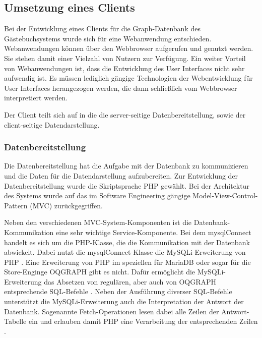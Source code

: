 \subsection{Umsetzung eines Clients}
Bei der Entwicklung eines Clients für die Graph-Datenbank des Gästebuchsystems wurde sich für eine Webanwendung entschieden. Webanwendungen können über den Webbrowser aufgerufen und genutzt werden. Sie stehen damit einer Vielzahl von Nutzern zur Verfügung. Ein weiter Vorteil von Webanwendungen ist, dass die Entwicklung des User Interfaces nicht sehr aufwendig ist. Es müssen lediglich gängige Technologien der Webentwicklung für User Interfaces herangezogen werden, die dann schließlich vom Webbrowser interpretiert werden.

Der Client teilt sich auf in die die server-seitige Datenbereitstellung, sowie der client-seitige Datendarstellung.

\subsubsection{Datenbereitstellung}
Die Datenbereitstellung hat die Aufgabe mit der Datenbank zu kommunizieren und die Daten für die Datendarstellung aufzubereiten. Zur Entwicklung der Datenbereitstellung wurde die Skriptsprache PHP gewählt. Bei der Architektur des Systems wurde auf das im Software Engineering gängige Model-View-Control-Pattern (MVC) zurückgegriffen.

Neben den verschiedenen MVC-System-Komponenten ist die Datenbank-Kommunikation eine sehr wichtige Service-Komponente. Bei dem \grqq mysqlConnect\grqq{} handelt es sich um die PHP-Klasse, die die Kommunikation mit der Datenbank abwickelt. Dabei nutzt die mysqlConnect-Klasse die MySQLi-Erweiterung von PHP \cite{PHP-Mysqli}. Eine Erweiterung von PHP im speziellen für MariaDB oder sogar für die Store-Enginge OQGRAPH gibt es nicht. Dafür ermöglicht die MySQLi-Erweiterung das Absetzen von regulären, aber auch von OQGRAPH entsprechende SQL-Befehle \cite{PHP-Mysqli-Query}. Neben der Ausführung diverser SQL-Befehle unterstützt die MySQLi-Erweiterung auch die Interpretation der Antwort der Datenbank. Sogenannte Fetch-Operationen lesen dabei alle Zeilen der Antwort-Tabelle ein und erlauben damit PHP eine Verarbeitung der entsprechenden Zeilen \cite{PHP-Mysqli-Fetch}.

